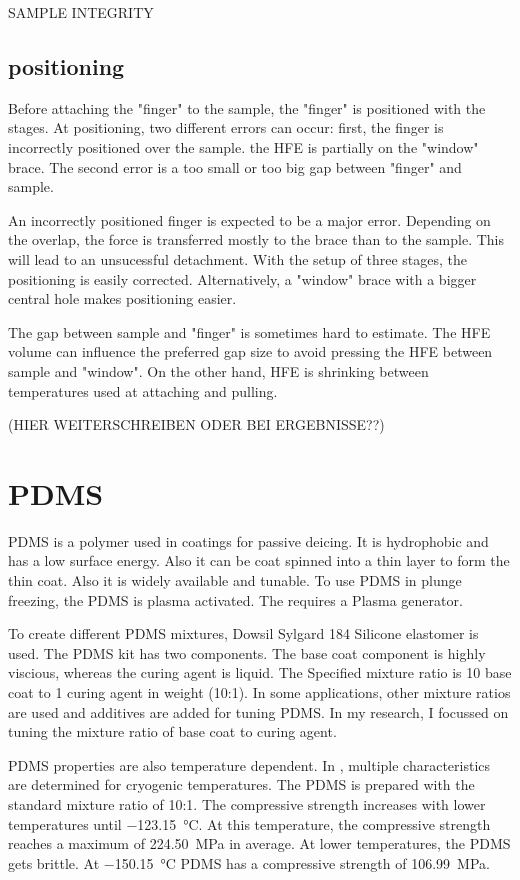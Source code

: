 SAMPLE INTEGRITY

\subsection{positioning}

Before attaching the "finger" to the sample, the "finger" is positioned with the stages. At positioning, two different errors can occur: first, the finger is incorrectly positioned over the sample. the HFE is partially on the "window" brace. The second error is a too small or too big gap between "finger" and sample. 

An incorrectly positioned finger is expected to be a major error. Depending on the overlap, the force is transferred mostly to the brace than to the sample. This will lead to an unsucessful detachment. With the setup of three stages, the positioning is easily corrected. Alternatively, a "window" brace with a bigger central hole makes positioning easier.

The gap between sample and "finger" is sometimes hard to estimate. The HFE volume can influence the preferred gap size to avoid pressing the HFE between sample and "window". On the other hand, HFE is shrinking between temperatures used at attaching and pulling.

 (HIER WEITERSCHREIBEN ODER BEI ERGEBNISSE??) 

\section{PDMS}

PDMS is a polymer used in coatings for passive deicing. It is hydrophobic and has a low surface energy. Also it can be coat spinned into a thin layer to form the thin coat. Also it is widely available and tunable. To use PDMS in plunge freezing, the PDMS is plasma activated. The requires a Plasma generator.

To create different PDMS mixtures, Dowsil Sylgard 184 Silicone elastomer is used\cite{DOW.}. The PDMS kit has two components. The base coat component is highly viscious, whereas the curing agent is liquid. The Specified mixture ratio is 10 base coat to 1 curing agent in weight (10:1). In some applications, other mixture ratios are used and additives are added for tuning PDMS. In my research, I focussed on tuning the mixture ratio of base coat to curing agent. 

PDMS properties are also temperature dependent. In \cite{Zhang.2020}, multiple characteristics are determined for cryogenic temperatures. The PDMS is prepared with the standard mixture ratio of 10:1. The compressive strength increases with lower temperatures until \SI{-123.15}{\degreeCelsius}. At this temperature, the compressive strength reaches a maximum of \SI{224.50}{\mega\pascal} in average. At lower temperatures, the PDMS gets brittle. At \SI{-150.15}{\degreeCelsius} PDMS has a compressive strength of \SI{106.99}{\mega\pascal}.

